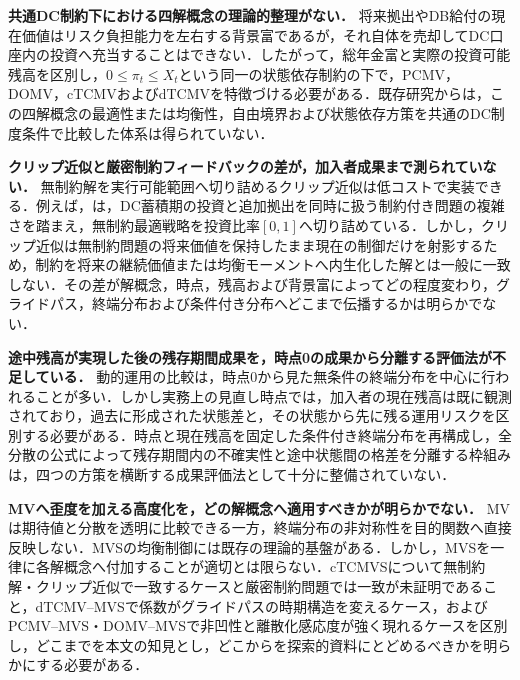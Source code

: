 \documentclass[10pt,a4paper]{article}
\theoremstyle{plain}
\theoremstyle{definition}
\begin{document}
\begin{description}[leftmargin=18mm,labelwidth=15mm,labelsep=3mm,itemsep=5pt,topsep=5pt,style=multiline]
  \item[\textbf{空白1}] \textbf{共通DC制約下における四解概念の理論的整理がない．}
  将来拠出やDB給付の現在価値はリスク負担能力を左右する背景富であるが，それ自体を売却してDC口座内の投資へ充当することはできない．したがって，総年金富と実際の投資可能残高を区別し，$0\leq\pi_t\leq X_t$という同一の状態依存制約の下で，PCMV，DOMV，cTCMVおよびdTCMVを特徴づける必要がある．既存研究からは，この四解概念の最適性または均衡性，自由境界および状態依存方策を共通のDC制度条件で比較した体系は得られていない．

  \item[\textbf{空白2}] \textbf{クリップ近似と厳密制約フィードバックの差が，加入者成果まで測られていない．}
  無制約解を実行可能範囲へ切り詰めるクリップ近似は低コストで実装できる．例えば，\citet{FerreiraMoriciVigna2025}は，DC蓄積期の投資と追加拠出を同時に扱う制約付き問題の複雑さを踏まえ，無制約最適戦略を投資比率$[0,1]$へ切り詰めている．しかし，クリップ近似は無制約問題の将来価値を保持したまま現在の制御だけを射影するため，制約を将来の継続価値または均衡モーメントへ内生化した解とは一般に一致しない．その差が解概念，時点，残高および背景富によってどの程度変わり，グライドパス，終端分布および条件付き分布へどこまで伝播するかは明らかでない．

  \item[\textbf{空白3}] \textbf{途中残高が実現した後の残存期間成果を，時点0の成果から分離する評価法が不足している．}
  動的運用の比較は，時点0から見た無条件の終端分布を中心に行われることが多い．しかし実務上の見直し時点では，加入者の現在残高は既に観測されており，過去に形成された状態差と，その状態から先に残る運用リスクを区別する必要がある．時点と現在残高を固定した条件付き終端分布を再構成し，全分散の公式によって残存期間内の不確実性と途中状態間の格差を分離する枠組みは，四つの方策を横断する成果評価法として十分に整備されていない．

  \item[\textbf{空白4}] \textbf{MVへ歪度を加える高度化を，どの解概念へ適用すべきかが明らかでない．}
  MVは期待値と分散を透明に比較できる一方，終端分布の非対称性を目的関数へ直接反映しない．MVSの均衡制御には既存の理論的基盤がある\citep{MuTianYang2019}．しかし，MVSを一律に各解概念へ付加することが適切とは限らない．cTCMVSについて無制約解・クリップ近似で一致するケースと厳密制約問題では一致が未証明であること，dTCMV--MVSで係数がグライドパスの時期構造を変えるケース，およびPCMV--MVS・DOMV--MVSで非凹性と離散化感応度が強く現れるケースを区別し，どこまでを本文の知見とし，どこからを探索的資料にとどめるべきかを明らかにする必要がある．
\end{description}
\end{document}
